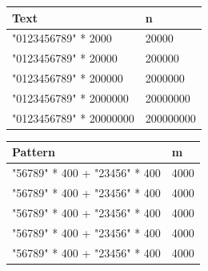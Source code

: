 \documentclass[11pt]{article}
\begin{document}
                \begin{table}[!htb]
                        \begin{minipage}{.5\linewidth}
                            \centering
                                \begin{tabular}{ll}
                                    \textbf{Text} & \textbf{n} \\
                                    \hline
                                    "0123456789" * 2000 & 20000 \\
                                    "0123456789" * 20000 & 200000 \\
                                    "0123456789" * 200000 & 2000000 \\
                                    "0123456789" * 2000000 & 20000000 \\
                                    "0123456789" * 20000000 & 200000000 \\
                                \end{tabular}
                        \end{minipage}%
                        \begin{minipage}{.5\linewidth}
                            \centering
                                \begin{tabular}{ll}
                                    \textbf{Pattern} & \textbf{m} \\
                                    \hline
                                    "56789" * 400 + "23456" * 400 & 4000 \\
                                    "56789" * 400 + "23456" * 400 & 4000 \\
                                    "56789" * 400 + "23456" * 400 & 4000 \\
                                    "56789" * 400 + "23456" * 400 & 4000 \\
                                    "56789" * 400 + "23456" * 400 & 4000 \\
                                \end{tabular}
                        \end{minipage}
                    \label{tab:test_2_2}
                \end{table}
\end{document}
